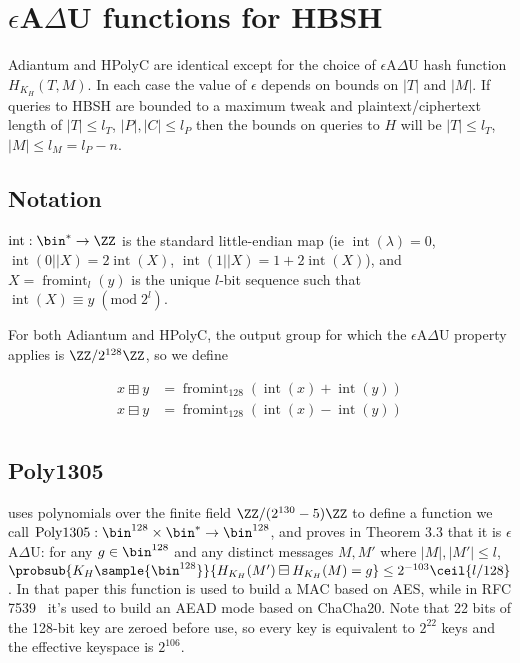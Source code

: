 \documentclass[journal=tosc,preprint,floatrow,submission]{iacrtrans}
\DeclareMathOperator{\Polydjb}{Poly1305}
\DeclareMathOperator{\intify}{int}
\DeclareMathOperator{\fromint}{fromint}
\begin{document}
\printbibliography

\appendix
\section{$\epsilon$A$\Delta$U functions for HBSH}\label{hashing}

Adiantum and HPolyC are identical except for the choice of $\epsilon$A$\Delta$U hash function
$H_{K_H}(T, M)$. In each case the value of $\epsilon$ depends on bounds on $|T|$ and $|M|$.
If queries to HBSH are bounded to a maximum tweak and plaintext/ciphertext length of
$|T| \leq l_T$, $|P|, |C| \leq l_P$
then the bounds on queries to $H$ will be $|T| \leq l_T$, $|M| \leq l_M = l_P - n$.

\subsection{Notation}

$\intify: \bin^{*} \rightarrow \ZZ$ is the
standard little-endian map
(ie $\intify(\lambda) = 0$, $\intify(0 || X) = 2\intify(X)$, $\intify(1 || X) = 1 + 2\intify(X)$),
and $X = \fromint_l(y)$ is the unique
$l$-bit sequence such that $\intify(X) \equiv y \;(\textrm{mod}\;2^l)$.

For both Adiantum and HPolyC,
the output group for which the $\epsilon$A$\Delta$U property applies is
$\ZZ/2^{128}\ZZ$, so we define

\begin{align*}
    x \boxplus y &= \fromint_{128}(\intify(x) + \intify(y)) \\
    x \boxminus y &= \fromint_{128}(\intify(x) - \intify(y)) \\
\end{align*}

\subsection{Poly1305}

\cite{poly1305} uses polynomials over the finite field $\ZZ/(2^{130}-5)\ZZ$
to define a function we call
$\Polydjb: \bin^{128} \times \bin^* \rightarrow \bin^{128}$,
and proves in Theorem 3.3 that it is $\epsilon$A$\Delta$U: for any
$g \in \bin^{128}$ and any distinct messages $M, M'$ where $|M|, |M'| \leq l$,
$\probsub{K_H \sample{\bin^{128}}}{H_{K_H}(M') \boxminus H_{K_H}(M) = g} \leq 2^{-103}\ceil{l/128}$.
In that paper this function is used to build a MAC based on AES, while in
RFC 7539~\cite{RFC7539} it's used to build an AEAD mode based on ChaCha20.
Note that 22 bits of the 128-bit key are zeroed before use, so every key is equivalent to
$2^{22}$ keys and the effective keyspace is $2^{106}$.
\end{document}
